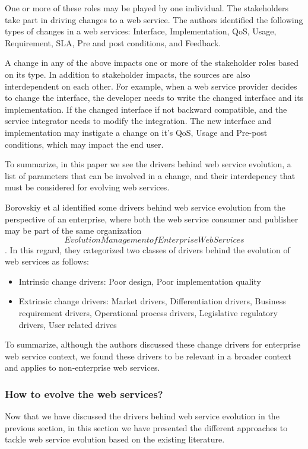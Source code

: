 \documentclass[runningheads,a4paper]{llncs}
\begin{document}
One or more of these roles may be played by one individual. The stakeholders take part in driving changes to a web service. The authors identified the following types of changes in a web services: Interface, Implementation, QoS, Usage, Requirement, SLA, Pre and post conditions, and Feedback.

A change in any of the above impacts one or more of the stakeholder roles based on its type. In addition to stakeholder impacts, the sources are also interdependent on each other. For example, when a web service provider decides to change the interface, the developer needs to write the changed interface and its implementation. If the changed interface if not backward compatible, and the service integrator needs to modify the integration. The new interface and implementation may instigate a change on it’s QoS, Usage and Pre-post conditions, which may impact the end user.

To summarize, in this paper we see the drivers behind web service evolution, a list of parameters that can be involved in a change, and their interdepency that must be considered for evolving web services.

Borovskiy et al identified some drivers behind web service evolution from the perspective of an enterprise, where both the web service consumer and publisher may be part of the same organization \[Evolution Management of Enterprise Web Services\]. In this regard, they categorized two classes of drivers behind the evolution of web services as follows:

\begin{itemize}
  \item Intrinsic change drivers: Poor design, Poor implementation quality
  \item Extrinsic change drivers: Market drivers, Differentiation drivers, Business requirement drivers, Operational process drivers, Legislative regulatory drivers, User related drives
\end{itemize}

To summarize, although the authors discussed these change drivers for enterprise web service context, we found these drivers to be relevant in a broader context and applies to non-enterprise web services.

\subsubsection{How to evolve the web services?} %
\label{sub:how_to_evolve_the_web_services_}
Now that we have discussed the drivers behind web service evolution in the previous section, in this section we have presented the different approaches to tackle web service evolution based on the existing literature.
\end{document}
